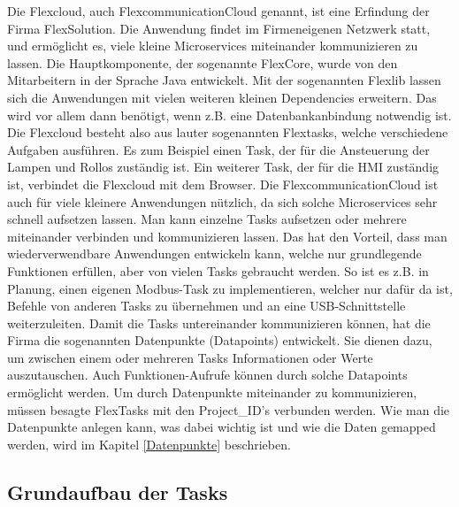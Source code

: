 Die Flexcloud, auch FlexcommunicationCloud genannt, ist eine Erfindung der Firma FlexSolution. Die Anwendung findet im Firmeneigenen Netzwerk statt, und ermöglicht es, viele kleine Microservices miteinander kommunizieren zu lassen. Die Hauptkomponente, der sogenannte FlexCore, wurde von den Mitarbeitern in der Sprache Java entwickelt. Mit der sogenannten Flexlib lassen sich die Anwendungen mit vielen weiteren kleinen Dependencies erweitern. Das wird vor allem dann benötigt, wenn z.B. eine Datenbankanbindung notwendig ist. Die Flexcloud besteht also aus lauter sogenannten Flextasks, welche verschiedene Aufgaben ausführen. Es zum Beispiel einen Task, der für die Ansteuerung der Lampen und Rollos zuständig ist. 
Ein weiterer Task, der für die HMI zuständig ist, verbindet die Flexcloud mit dem Browser. Die FlexcommunicationCloud ist auch für viele kleinere Anwendungen nützlich, da sich solche Microservices sehr schnell aufsetzen lassen. Man kann einzelne Tasks aufsetzen oder mehrere miteinander verbinden und kommunizieren lassen. Das hat den Vorteil, dass man wiederverwendbare Anwendungen entwickeln kann, welche nur grundlegende Funktionen erfüllen, aber von vielen Tasks gebraucht werden. So ist es z.B. in Planung, einen eigenen Modbus-Task zu implementieren, welcher nur dafür da ist, Befehle von anderen Tasks zu übernehmen und an eine USB-Schnittstelle weiterzuleiten. 
Damit die Tasks untereinander kommunizieren können, hat die Firma die sogenannten Datenpunkte (Datapoints) entwickelt. Sie dienen dazu, um zwischen einem oder mehreren Tasks Informationen oder Werte auszutauschen. Auch Funktionen-Aufrufe können durch solche Datapoints ermöglicht werden. Um durch Datenpunkte miteinander zu kommunizieren, müssen besagte FlexTasks mit den Project\_ID's verbunden werden. 
Wie man die Datenpunkte anlegen kann, was dabei wichtig ist und wie die Daten gemapped werden, wird im Kapitel \ref{Datenpunkte} beschrieben.
\subsection{Grundaufbau der Tasks}

